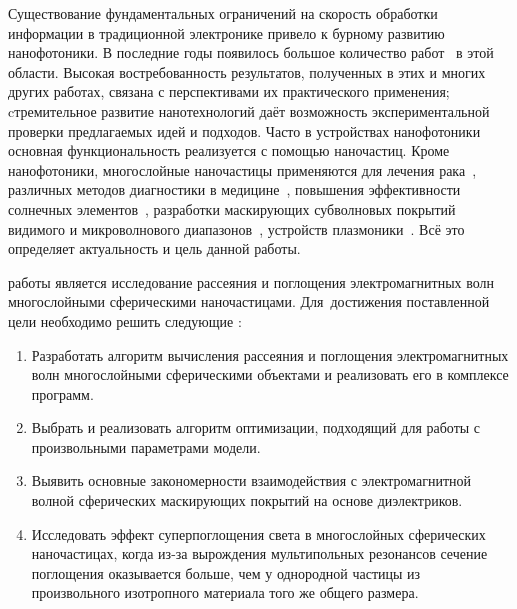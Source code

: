 {\actuality} Существование фундаментальных ограничений на скорость
обработки информации в традиционной электронике привело к бурному
развитию нанофотоники. В последние годы появилось большое количество
работ~\cite{Tame-quantum-plasmonics-2013,
  Javier-graphene-plasmonics-2014, Khurgin-loss-plasmonics-2015,
  He-tunable-terahertz-graphene-metamaterials-2015,
  Segal-meta-nonlinar-PhC-2015,
  Poddubny-hyperbolic-metamaterials-2013, Kildishev-metasurface-2013}
в этой области.  Высокая востребованность результатов, полученных в
этих и многих других работах, связана с перспективами их практического
применения; cтремительное развитие нанотехнологий даёт возможность
экспериментальной проверки предлагаемых идей и подходов. Часто в
устройствах нанофотоники основная функциональность реализуется с
помощью наночастиц. Кроме нанофотоники, многослойные наночастицы применяются
для лечения рака~\cite{Zhang-2010, Hirsch-2003}, различных методов
диагностики в медицине~\cite{Allain-2002}, повышения эффективности
солнечных элементов~\cite{Kameya-2011, Mann-2011}, разработки
маскирующих субволновых покрытий видимого и микроволнового
диапазонов~\cite{Qui-2009, Semouchkina-2013}, устройств
плазмоники~\cite{Martin-2013, Alu-2005}.  Всё это определяет
актуальность и цель данной работы.

{\aim} работы является %
исследование рассеяния и поглощения электромагнитных волн многослойными
сферическими наночастицами.
Для~достижения поставленной цели необходимо решить следующие {\tasks}:
\begin{enumerate}
  \item Разработать алгоритм вычисления рассеяния и поглощения
    электромагнитных волн
    многослойными сферическими объектами и реализовать его в комплексе программ.
  \item Выбрать и реализовать алгоритм оптимизации, подходящий для
    работы с произвольными параметрами модели.%
  \item Выявить основные закономерности взаимодействия с
    электромагнитной волной сферических маскирующих покрытий на
    основе диэлектриков.
  \item Исследовать эффект суперпоглощения света в многослойных
    сферических наночастицах, когда из-за вырождения мультипольных
    резонансов сечение поглощения оказывается больше, чем у однородной
    частицы из произвольного изотропного материала того же общего
    размера.
\end{enumerate}

